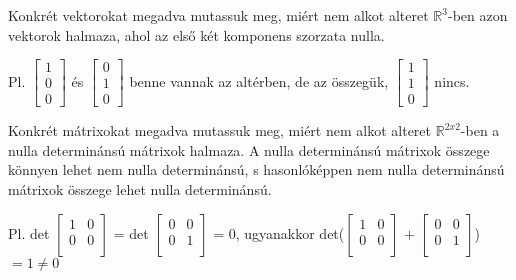 \begin{frame}
  \begin{tcolorbox}[title={2/1. {\symrook}}]
      Konkrét vektorokat megadva mutassuk meg, miért nem alkot alteret $\mathbb{R}^3$-ben azon vektorok halmaza, ahol az első két komponens szorzata nulla. 
  \tcblower

    \mmedskip 
  
   Pl. $\begin{bmatrix} 
  				1  \\
  				0 \\
  				0
			\end{bmatrix}$ és $\begin{bmatrix} 
  				0  \\
  				1 \\
  				0
			\end{bmatrix}$ benne vannak az altérben, de az összegük, $\begin{bmatrix} 
  				1  \\
  				1 \\
  				0
			\end{bmatrix}$ nincs.
  \end{tcolorbox}
\end{frame}


\begin{frame}
  \begin{tcolorbox}[title={2/2. {\symqueen}}]
      Konkrét mátrixokat megadva mutassuk meg, miért nem alkot alteret $\mathbb{R}^{2 x 2}$-ben a nulla determinánsú mátrixok halmaza. 
  \tcblower
    A nulla determinánsú mátrixok összege könnyen lehet nem nulla determinánsú, s hasonlóképpen nem nulla determinánsú mátrixok összege lehet nulla determinánsú.\\
    \mmedskip 
  
    Pl. det $\begin{bmatrix} 
  				1 & 0  \\
  				0 & 0\\
			\end{bmatrix}$ = det $\begin{bmatrix} 
  				0 & 0 \\
  				0 & 1 \\
			\end{bmatrix}$ = 0, ugyanakkor det($\begin{bmatrix} 
  				1 & 0  \\
  				0 & 0\\
			\end{bmatrix}$ $+$ $\begin{bmatrix} 
  				0 & 0 \\
  				0 & 1 \\
			\end{bmatrix}$) $=1 \neq 0$
  \end{tcolorbox}
\end{frame}

